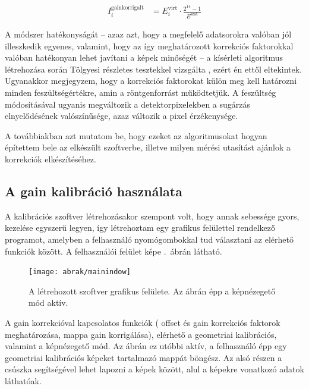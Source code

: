 \documentclass[a4paper,12pt]{article}
\begin{document}
\begin{equation}
\label{eq:gainkorrigalt}
\begin{split}
 I_i^{\text{gainkorrigalt}} &= E_i^{\text{virt}}  \cdot \frac{2^{14} -1}{E^\text{szat}}
 \end{split}
\end{equation}


A módszer hatékonyságát -- azaz azt, hogy a megfelelő adatsorokra valóban jól illeszkedik egyenes, valamint, hogy az így meghatározott korrekciós faktorokkal valóban hatékonyan lehet javítani a képek minőségét -- a kísérleti algoritmus létrehozása során Tölgyesi részletes tesztekkel vizsgálta \cite{botond}, ezért én ettől eltekintek. Ugyanakkor megjegyzem, hogy a korrekciós faktorokat külön meg kell határozni minden feszültségértékre, amin a röntgenforrást működtetjük. A feszültség módosításával ugyanis megváltozik a detektorpixelekben a sugárzás elnyelődésének valószínűsége, azaz változik a pixel érzékenysége.


A továbbiakban azt mutatom be, hogy ezeket az algoritmusokat hogyan építettem bele az elkészült szoftverbe, illetve milyen mérési utasítást ajánlok a korrekciók elkészítéséhez.


\subsection{A gain kalibráció használata}


A kalibrációs szoftver létrehozásakor szempont volt, hogy annak sebessége gyors, kezelése egyszerű legyen, így létrehoztam egy grafikus felülettel rendelkező programot, amelyben a felhasználó nyomógombokkal tud választani az elérhető funkciók között. A felhasználói felület képe .~ábrán látható.



 \begin{figure}[htbp]
\center
\texttt{[image: abrak/mainindow]}
\caption{A létrehozott szoftver grafikus felülete. Az ábrán épp a képnézegető mód aktív.}
\label{fig:mainwindow}
\end{figure}
 A gain korrekcióval kapcsolatos funkciók ( offset és gain korrekciós faktorok meghatározása, mappa gain korrigálása), elérhető a geometriai kalibrációs, valamint a képnézegető mód. Az ábrán ez utóbbi aktív, a felhasználó épp egy geometriai kalibrációs képeket tartalmazó mappát böngész. Az alsó részen a csúszka segítségével lehet lapozni a képek között, alul a képekre vonatkozó adatok láthatóak.
\end{document}
